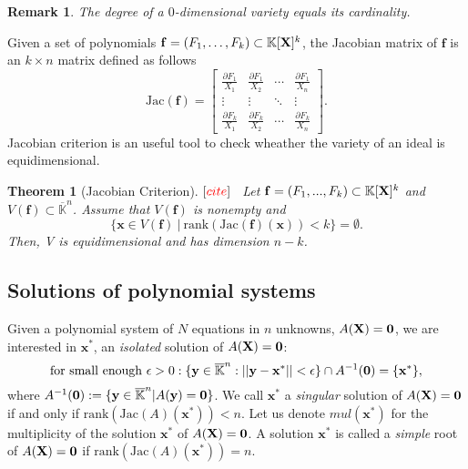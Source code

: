 \documentclass[11pt]{article}
\numberwithin{Property}{section}
\newtheorem{Theorem}{Theorem}%
\numberwithin{Theorem}{section}
\numberwithin{Proposition}{section}
\numberwithin{Lemma}{section}
\numberwithin{Corollary}{section}
\numberwithin{Definition}{section}
\newtheorem{Remark}{Remark}%
\numberwithin{Remark}{section}
\numberwithin{Conjecture}{section}
\numberwithin{Problem}{section}
\numberwithin{Example}{section}
\numberwithin{Claim}{section}
\def\bar{\overline}
\newcommand{\field}{\mathbb{K}} %
\newcommand{\mat}[1]{\mathbf{\MakeUppercase{#1}}} %
\newcommand{\todo}[1]{\textcolor{red}{#1}} %
\begin{document}
\begin{Remark} The degree of a $0$-dimensional variety equals its cardinality.
\end{Remark}
Given a set of polynomials $\mathbf{f} = (F_1, \ldots, F_k) \subset \field[\mat{X}]^k$, the Jacobian matrix of $\mathbf{f}$ is an $k \times n$ matrix defined as follows 
\[
\mathrm{Jac}(\mathbf{f}) = \left[ \begin{matrix}
\frac{\partial F_1}{X_1} & \frac{\partial F_1}{X_2} & \cdots & \frac{\partial F_1}{X_n}\\
\vdots & \vdots & \ddots & \vdots\\
\frac{\partial F_k}{X_1} & \frac{\partial F_k}{X_2} & \cdots & \frac{\partial F_k}{X_n}
\end{matrix} \right].
\]
Jacobian criterion is an useful tool to check wheather the variety of an ideal is equidimensional. 
\begin{Theorem}[Jacobian Criterion] $[\todo{cite}]$  \
Let $\mathbf{f} = (F_1, ..., F_k) \subset \field[\mat{X}]^k$ and $V(\mathbf{f}) \subset \bar{\field}^n $. Assume that $V(\mathbf{f})$ is nonempty and
\[
\{\mathbf{x} \in V(\mathbf{f}) \ | \ \mathrm{rank}(\mathrm{Jac}(\mathbf{f})({\mathbf{x}})) < k\} = \emptyset .
\] Then, V is equidimensional and has dimension $n - k$.
\end{Theorem}

\subsection{Solutions of polynomial systems}
Given a polynomial system of $N$ equations in $n$ unknowns, $A(\mat{X}) = \mat{0}$, we are interested in $\mathbf{x}^*$, an \emph{isolated} solution of $A(\mat{X}) = \mat{0}$:
\[
\mathrm{for \ small \ enough} \ \epsilon > 0 : \{\mathbf{y} \in \bar{\field}^n : ||\mathbf{y} - \mathbf{x}^*|| < \epsilon\} \cap A^{-1}(\mat{0}) = \{\mathbf{x}^*\}, 
\] where $A^{-1}(\mat{0}) := \{\mathbf{y} \in \bar{\field}^n | A(\mathbf{y}) = \mat{0}\}$. We call $\mathbf{x}^*$ a \emph{singular} solution of $A(\mat{X}) = \mat{0}$ if and only if $\mathrm{rank}(\mathrm{Jac}(A)(\mathbf{x}^*)) < n$.  Let us denote $mul(\mathbf{x}^*)$ for the multiplicity of the solution $\mathbf{x}^*$ of $A(\mat{X}) = \mat{0}$.   A solution $\mathbf{x}^*$ is called a \emph{simple} root of $A(\mat{X}) = \mat{0}$ if  $\mathrm{rank}(\mathrm{Jac}(A)(\mathbf{x}^*)) = n$.
\end{document}
